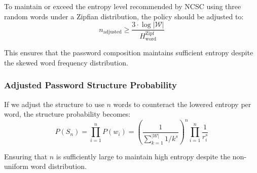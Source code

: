To maintain or exceed the entropy level recommended by NCSC using three random words under a Zipfian distribution, the policy should be adjusted to:
   \[
n_{\text{adjusted}} \geq \frac{3 \cdot \log |\mathcal{W}|}{H_{\text{word}}^{\text{Zipf}}}
   \]
   
   This ensures that the password composition maintains sufficient entropy despite the skewed word frequency distribution.
   
\subsubsection{Adjusted Password Structure Probability}

   If we adjust the structure to use \( n \) words to counteract the lowered entropy per word, the structure probability becomes:
   \begin{equation}
P(S_n) = \prod_{i=1}^{n} P(w_i) = \left( \frac{1}{\sum_{k=1}^{|\mathcal{W}|} 1 / k^s} \right)^n \prod_{i=1}^{n} \frac{1}{r_i^s}
   \end{equation}
   
   Ensuring that \( n \) is sufficiently large to maintain high entropy despite the non-uniform word distribution.



%
%   

%
%   
%
%
%   

